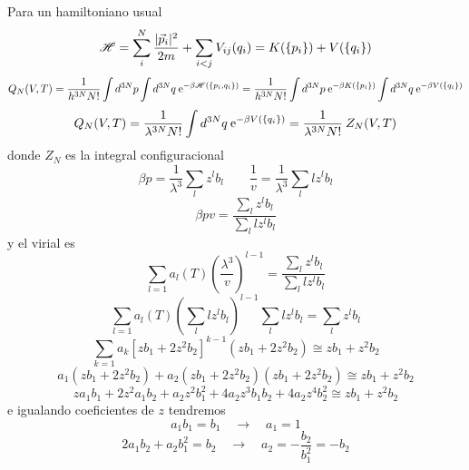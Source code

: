 \documentclass[10pt,oneside]{CBFT_book}
\begin{document}
Para un hamiltoniano usual
\[
	\mathscr{H} = \sum_i^N \frac{|\vec{p}_i|^2}{2m} + \sum_{i<j} V_{ij}(q_i) = K(\{ p_i \}) + V(\{ q_i \})
\]
\[
	Q_N(V,T) = \frac{1}{h^{3N}N!}\int d^{3N}p \int d^{3N}q \:\mathrm{e}^{-\beta \mathscr{H}(\{ p_i,q_i \})} =
	\frac{1}{h^{3N}N!}\int d^{3N}p \:\mathrm{e}^{-\beta K(\{ p_i \})}  \int d^{3N}q \:\mathrm{e}^{-\beta V(\{ q_i \}) } 
\]
\[
	Q_N(V,T) = \frac{1}{\lambda^{3N}N!} \int d^{3N}q \:\mathrm{e}^{-\beta V(\{ q_i \}) }  =
	\frac{1}{\lambda^{3N}N!} \: Z_N(V,T)
\]
donde $Z_N$ es la integral configuracional
\[
	\beta p = \frac{1}{\lambda^3} \sum_l z^l b_l  \qquad \frac{1}{v} = \frac{1}{\lambda^3} \sum_l lz^l b_l 
\]
\[
	\beta p v = \frac{ \sum_l z^l b_l }{ \sum_l l z^l b_l  }
\]
y el virial es 
\[
	\sum_{l=1} a_l(T) \left( \frac{\lambda^3}{v} \right)^{l-1} = \frac{ \sum_l z^l b_l }{ \sum_l l z^l b_l  }
\]
\[
	\sum_{l=1} a_l(T) \left( \sum_l l z^l b_l \right)^{l-1} \sum_l l z^l b_l = \sum_l z^l b_l 
\]
\[
	\sum_{k=1} a_k [ zb_1 + 2z^2b_2 ]^{k-1} (zb_1+2z^2b_2) \cong zb_1 + z^2b_2
\]
\[
	a_1(zb_1+2z^2b_2) + a_2(zb_1+2z^2b_2) (zb_1+2z^2b_2) \cong zb_1 + z^2b_2
\]
\[
	za_1b_1 + 2z^2a_1b_2 + a_2z^2b_1^2 + 4a_2z^3b_1b_2 + 4 a_2 z^4 b_2^2 \cong zb_1 + z^2b_2
\]
e igualando coeficientes de $ z $ tendremos 
\[
 	a_1b_1 = b_1 \quad \rightarrow \quad a_1 = 1
\]
\[
	2a_1b_2 + a_2b_1^2 = b_2  \quad \rightarrow \quad  a_2 = -\frac{b_2}{b_1^2} = -b_2
\]





\end{document}
